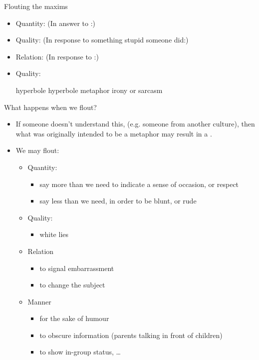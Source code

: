 \documentclass{beamer}
\begin{document}
\begin{frame}{Flouting the maxims}
\begin{itemize}
\item Quantity:	(In answer to :) 
\item Quality:	(In response to something stupid someone did:) 
\item Relation:	(In response to :) 
\item Quality:
  \begin{exe}
    \ex {} \hfill hyperbole
    \ex {} \hfill hyperbole    \ex {} \hfill metaphor
    \ex {} \hfill irony or sarcasm
  \end{exe}
  
\end{itemize}

\end{frame}

\begin{frame}{What happens when we flout?}
\begin{itemize}
\item If someone doesn't understand this, (e.g. someone from another
  culture), then what was originally intended to be a metaphor may
  result in a .
\item We may flout: 
  \begin{itemize}
\item Quantity: 
  \begin{itemize}
  \item say  more than we need to indicate a sense of occasion, or respect
  \item  say less than we need, in order to be blunt, or rude
  \end{itemize}
\item Quality: 
  \begin{itemize}
  \item white lies
  \end{itemize}
\item Relation  
  \begin{itemize}
  \item to signal embarrassment
  \item to change the subject
  \end{itemize}
\item Manner
  \begin{itemize}
  \item for the   sake of humour
  \item to obscure information (parents talking in front of children)
  \item to show in-group status,  \ldots
  \end{itemize}
\end{itemize}
\end{itemize}


\end{frame}
\end{document}
